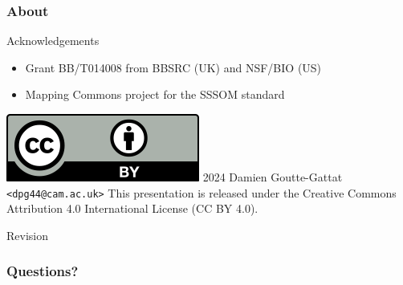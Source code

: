 \begin{frame}
  \frametitle{About}

  \begin{block}{Acknowledgements}
    \begin{itemize}
      \item Grant BB/T014008 from BBSRC (UK) and NSF/BIO (US)
      \item Mapping Commons project for the SSSOM standard
    \end{itemize}
  \end{block}

  \begin{block}{\includegraphics[scale=.26]{ccby}\hspace{.2em}%
    2024 Damien Goutte-Gattat \texttt{<dpg44@cam.ac.uk>}}
    This presentation is released under the Creative Commons Attribution
    4.0 International License (CC BY 4.0).
  \end{block}

  \begin{block}{Revision}\ttfamily\scriptsize
    
  \end{block}
\end{frame}

\appendix
\begin{frame}[noframenumbering]
  \frametitle{Questions?}
\end{frame}

